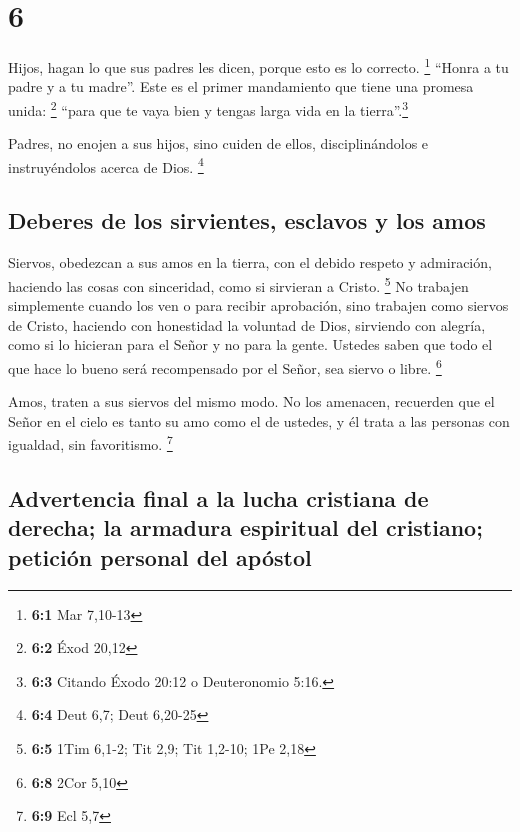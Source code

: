 \hypertarget{section-5}{%
\section{6}\label{section-5}}

 Hijos, hagan lo que sus padres les dicen, porque esto es
lo correcto. \footnote{\textbf{6:1} Mar 7,10-13}  ``Honra
a tu padre y a tu madre''. Este es el primer mandamiento que tiene una
promesa unida: \footnote{\textbf{6:2} Éxod 20,12}  ``para
que te vaya bien y tengas larga vida en la tierra''.\footnote{\textbf{6:3}
  Citando Éxodo 20:12 o Deuteronomio 5:16.}

 Padres, no enojen a sus hijos, sino cuiden de ellos,
disciplinándolos e instruyéndolos acerca de Dios. \footnote{\textbf{6:4}
  Deut 6,7; Deut 6,20-25}

\hypertarget{deberes-de-los-sirvientes-esclavos-y-los-amos}{%
\subsection{Deberes de los sirvientes, esclavos y los
amos}\label{deberes-de-los-sirvientes-esclavos-y-los-amos}}

 Siervos, obedezcan a sus amos en la tierra, con el debido
respeto y admiración, haciendo las cosas con sinceridad, como si
sirvieran a Cristo. \footnote{\textbf{6:5} 1Tim 6,1-2; Tit 2,9; Tit
  1,2-10; 1Pe 2,18}  No trabajen simplemente cuando los
ven o para recibir aprobación, sino trabajen como siervos de Cristo,
haciendo con honestidad la voluntad de Dios,  sirviendo
con alegría, como si lo hicieran para el Señor y no para la gente.
 Ustedes saben que todo el que hace lo bueno será
recompensado por el Señor, sea siervo o libre. \footnote{\textbf{6:8}
  2Cor 5,10}

 Amos, traten a sus siervos del mismo modo. No los
amenacen, recuerden que el Señor en el cielo es tanto su amo como el de
ustedes, y él trata a las personas con igualdad, sin favoritismo.
\footnote{\textbf{6:9} Ecl 5,7}

\hypertarget{advertencia-final-a-la-lucha-cristiana-de-derecha-la-armadura-espiritual-del-cristiano-peticiuxf3n-personal-del-apuxf3stol}{%
\subsection{Advertencia final a la lucha cristiana de derecha; la
armadura espiritual del cristiano; petición personal del
apóstol}\label{advertencia-final-a-la-lucha-cristiana-de-derecha-la-armadura-espiritual-del-cristiano-peticiuxf3n-personal-del-apuxf3stol}}

